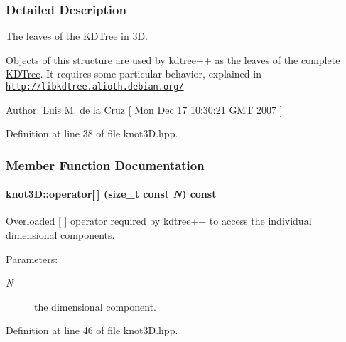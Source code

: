 \subsubsection{Detailed Description}
The leaves of the \hyperlink{namespaceKDTree}{KDTree} in 3D. 

Objects of this structure are used by kdtree++ as the leaves of the complete \hyperlink{namespaceKDTree}{KDTree}. It requires some particular behavior, explained in \href{http://libkdtree.alioth.debian.org/}{\tt http://libkdtree.alioth.debian.org/} \begin{Desc}
\item[Author:]Luis M. de la Cruz \mbox{[} Mon Dec 17 10:30:21 GMT 2007 \mbox{]} \end{Desc}


Definition at line 38 of file knot3D.hpp.

\subsubsection{Member Function Documentation}
\hypertarget{structknot3D_6509aed0744e1edc9bab30e261ae3816}{
\paragraph[{operator[]}]{ knot3D::operator\mbox{[}$\,$\mbox{]} (size\_\-t const  {\em N}) const}\hfill}
\label{structknot3D_6509aed0744e1edc9bab30e261ae3816}


Overloaded \mbox{[} \mbox{]} operator required by kdtree++ to access the individual dimensional components. 

\begin{Desc}
\item[Parameters:]
\begin{description}
\item[{\em N}]the dimensional component. \end{description}
\end{Desc}


Definition at line 46 of file knot3D.hpp.